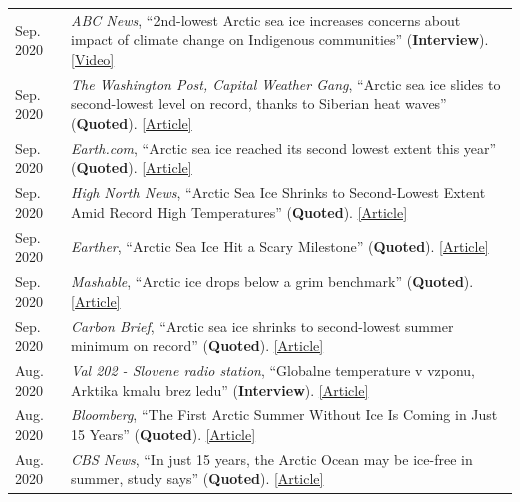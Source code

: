\documentclass[margin,line,palatino,courier,10pt]{res}
\begin{document}
\begin{resume}
\begin{tabular}{@{}p{0.9in}p{4in}}
Sep. 2020 & \textit{ABC News}, ``2nd-lowest Arctic sea ice increases concerns about impact of climate change on Indigenous communities'' (\textbf{Interview}). \href{https://abcnews.go.com/International/2nd-lowest-arctic-sea-ice-increases-concerns-impact/story?id=73224755}{[Video]}\\
Sep. 2020 & \textit{The Washington Post, Capital Weather Gang}, ``Arctic sea ice slides to second-lowest level on record, thanks to Siberian heat waves'' (\textbf{Quoted}). \href{https://www.washingtonpost.com/weather/2020/09/22/arctic-sea-ice-low/}{[Article]}\\
Sep. 2020 & \textit{Earth.com}, ``Arctic sea ice reached its second lowest extent this year'' (\textbf{Quoted}). \href{https://www.earth.com/news/arctic-sea-ice-reached-its-second-lowest-extent-this-year/}{[Article]}\\
Sep. 2020 & \textit{High North News}, ``Arctic Sea Ice Shrinks to Second-Lowest Extent Amid Record High Temperatures'' (\textbf{Quoted}). \href{https://www.highnorthnews.com/en/arctic-sea-ice-shrinks-second-lowest-extent-amid-record-high-temperatures}{[Article]}\\
Sep. 2020 & \textit{Earther}, ``Arctic Sea Ice Hit a Scary Milestone'' (\textbf{Quoted}). \href{https://earther.gizmodo.com/arctic-sea-ice-hit-a-scary-milestone-1845133739}{[Article]}\\
Sep. 2020 & \textit{Mashable}, ``Arctic ice drops below a grim benchmark'' (\textbf{Quoted}). \href{https://mashable.com/article/arctic-sea-ice-decline-2020/}{[Article]}\\
Sep. 2020 & \textit{Carbon Brief}, ``Arctic sea ice shrinks to second-lowest summer minimum on record'' (\textbf{Quoted}). \href{https://www.carbonbrief.org/arctic-sea-ice-shrinks-to-second-lowest-summer-minimum-on-record}{[Article]}\\
Aug. 2020 & \textit{Val 202 - Slovene radio station}, ``Globalne temperature v vzponu, Arktika kmalu brez ledu'' (\textbf{Interview}). \href{https://val202.rtvslo.si/2020/08/aktualno-20/}{[Article]}\\
Aug. 2020 & \textit{Bloomberg}, ``The First Arctic Summer Without Ice Is Coming in Just 15 Years'' (\textbf{Quoted}). \href{https://www.bloomberg.com/news/articles/2020-08-17/the-first-arctic-summer-without-ice-is-coming-in-just-15-years?srnd=premium}{[Article]}\\
Aug. 2020 & \textit{CBS News}, ``In just 15 years, the Arctic Ocean may be ice-free in summer, study says'' (\textbf{Quoted}). \href{https://www.cbsnews.com/news/arctic-ocean-climate-change-ice-free-15-years/}{[Article]}\\

\end{tabular}
\end{resume}
\end{document}
